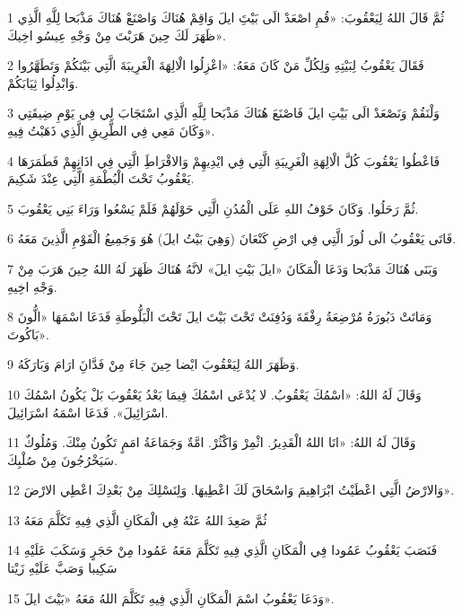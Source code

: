 \par 1 ثُمَّ قَالَ اللهُ لِيَعْقُوبَ: «قُمِ اصْعَدْ الَى بَيْتَِ ايلَ وَاقِمْ هُنَاكَ وَاصْنَعْ هُنَاكَ مَذْبَحا لِلَّهِ الَّذِي ظَهَرَ لَكَ حِينَ هَرَبْتَ مِنْ وَجْهِ عِيسُو اخِيكَ».
\par 2 فَقَالَ يَعْقُوبُ لِبَيْتِهِ وَلِكُلِّ مَنْ كَانَ مَعَهُ: «اعْزِلُوا الْالِهَةَ الْغَرِيبَةَ الَّتِي بَيْنَكُمْ وَتَطَهَّرُوا وَابْدِلُوا ثِيَابَكُمْ.
\par 3 وَلْنَقُمْ وَنَصْعَدْ الَى بَيْتِ ايلَ فَاصْنَعَ هُنَاكَ مَذْبَحا لِلَّهِ الَّذِي اسْتَجَابَ لِي فِي يَوْمِ ضِيقَتِي وَكَانَ مَعِي فِي الطَّرِيقِ الَّذِي ذَهَبْتُ فِيهِ».
\par 4 فَاعْطُوا يَعْقُوبَ كُلَّ الْالِهَةِ الْغَرِيبَةِ الَّتِي فِي ايْدِيهِمْ وَالاقْرَاطَِ الَّتِي فِي اذَانِهِمْ فَطَمَرَهَا يَعْقُوبُ تَحْتَ الْبُطْمَةِ الَّتِي عِنْدَ شَكِيمَ.
\par 5 ثُمَّ رَحَلُوا. وَكَانَ خَوْفُ اللهِ عَلَى الْمُدُنِ الَّتِي حَوْلَهُمْ فَلَمْ يَسْعُوا وَرَاءَ بَنِي يَعْقُوبَ.
\par 6 فَاتَى يَعْقُوبُ الَى لُوزَ الَّتِي فِي ارْضِ كَنْعَانَ (وَهِيَ بَيْتُ ايلَ) هُوَ وَجَمِيعُ الْقَوْمِ الَّذِينَ مَعَهُ.
\par 7 وَبَنَى هُنَاكَ مَذْبَحا وَدَعَا الْمَكَانَ «ايلَ بَيْتِ ايلَ» لانَّهُ هُنَاكَ ظَهَرَ لَهُ اللهُ حِينَ هَرَبَ مِنْ وَجْهِ اخِيهِ.
\par 8 وَمَاتَتْ دَبُورَةُ مُرْضِعَةُ رِفْقَةَ وَدُفِنَتْ تَحْتَ بَيْتَ ايلَ تَحْتَ الْبَلُّوطَةِ فَدَعَا اسْمَهَا «الُّونَ بَاكُوتَ».
\par 9 وَظَهَرَ اللهُ لِيَعْقُوبَ ايْضا حِينَ جَاءَ مِنْ فَدَّانَِ ارَامَ وَبَارَكَهُ.
\par 10 وَقَالَ لَهُ اللهُ: «اسْمُكَ يَعْقُوبُ. لا يُدْعَى اسْمُكَ فِيمَا بَعْدُ يَعْقُوبَ بَلْ يَكُونُ اسْمُكَ اسْرَائِيلَ». فَدَعَا اسْمَهُ اسْرَائِيلَ.
\par 11 وَقَالَ لَهُ اللهُ: «انَا اللهُ الْقَدِيرُ. اثْمِرْ وَاكْثُرْ. امَّةٌ وَجَمَاعَةُ امَمٍ تَكُونُ مِنْكَ. وَمُلُوكٌ سَيَخْرُجُونَ مِنْ صُلْبِكَ.
\par 12 وَالارْضُ الَّتِي اعْطَيْتُ ابْرَاهِيمَ وَاسْحَاقَ لَكَ اعْطِيهَا. وَلِنَسْلِكَ مِنْ بَعْدِكَ اعْطِي الارْضَ».
\par 13 ثُمَّ صَعِدَ اللهُ عَنْهُ فِي الْمَكَانِ الَّذِي فِيهِ تَكَلَّمَ مَعَهُ
\par 14 فَنَصَبَ يَعْقُوبُ عَمُودا فِي الْمَكَانِ الَّذِي فِيهِ تَكَلَّمَ مَعَهُ عَمُودا مِنْ حَجَرٍ وَسَكَبَ عَلَيْهِ سَكِيبا وَصَبَّ عَلَيْهِ زَيْتا
\par 15 وَدَعَا يَعْقُوبُ اسْمَ الْمَكَانِ الَّذِي فِيهِ تَكَلَّمَ اللهُ مَعَهُ «بَيْتَ ايلَ».
